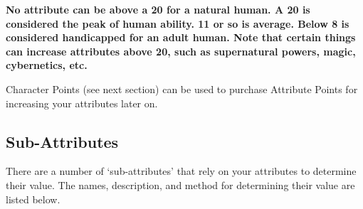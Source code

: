 \documentclass[twoside]{book}
\begin{document}
 \textbf{ No attribute can be above a 20 for a natural human.
               A 20 is considered the peak of human ability. 11 or so is
               average. Below 8 is considered handicapped for an adult
               human. Note that certain things can increase attributes
               above 20, such as supernatural powers, magic, cybernetics,
               etc. }


    {  
     Character Points (see next section) can be used to
               purchase Attribute Points for increasing your attributes
               later on. 
    }
  
    

\subsection{Sub-Attributes}
    
    {  
     There are a number of `sub-attributes'
               that rely on your attributes to determine their value. The
               names, description, and method for determining their value
               are listed below. 
    }
  
\end{document}
